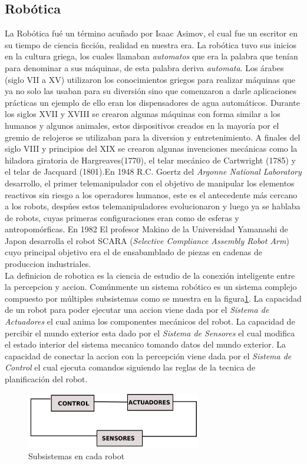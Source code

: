 \documentclass[conference]{IEEEtran}
\begin{document}
\subsection{Rob\'otica}
La Rob\'otica fu\'e un t\'ermino acu\~nado por Isaac Asimov, el cual fue un escritor en su tiempo de ciencia ficci\'on, realidad en nuestra era. La rob\'otica tuvo sus inicios en la cultura griega, los cuales llamaban \emph{automatos} que era la palabra que ten\'ian para denominar a sus m\'aquinas, de esta palabra deriva \emph{automata}. Los \'arabes (siglo VII a XV) utilizaron los conocimientos griegos para realizar m\'aquinas que ya no solo las usaban para su diversi\'on sino que comenzaron a darle aplicaciones pr\'acticas un ejemplo de ello eran los dispensadores de agua autom\'aticos. Durante los siglos XVII y XVIII  se crearon algunas m\'aquinas con forma similar a los humanos y algunos animales, estos dispositivos creados en la mayor\'ia por el gremio de relojeros se utilizaban para la diversion y entretenimiento. A finales del siglo VIII y principios del XIX se crearon algunas invenciones mec\'anicas como la hiladora giratoria de Hargreaves(1770), el telar mec\'anico de Cartwright (1785) y el telar de Jacquard (1801).En 1948 R.C. Goertz del \emph{Argonne National Laboratory} desarrollo, el primer telemanipulador con el objetivo de manipular los elementos reactivos sin riesgo a los operadores humanos, este es el antecedente m\'as cercano a los robots, desp\'ues estos telemanipuladores evolucionaron y luego ya se hablaba de robots, cuyas primeras configuraciones eran como de esferas y antropom\'orficas. En 1982 El profesor Makino de la Universidad Yamanashi de Japon desarrolla el robot SCARA (\emph{Selective Compliance Assembly Robot Arm}) cuyo principal objetivo era el de ensabamblado de piezas en cadenas de produccion industriales. \cite{lib_rob1}\\
La definicion de robotica es la ciencia de estudio de la conexi\'on inteligente entre la percepcion y accion. Com\'unmente un sistema rob\'otico es un sistema complejo compuesto por m\'ultiples subsistemas como se muestra en la figura\ref{fig_rob}. La capacidad de un robot para poder ejecutar una accion viene dada por el \textit{Sistema de Actuadores} el cual anima los componentes mec\'anicos del robot. La capacidad de percibir el mundo exterior esta dado por el \textit{Sistema de Sensores} el cual modifica el estado interior del sistema mecanico tomando datos del mundo exterior. La capacidad de conectar la accion con la percepci\'on viene dada por el \textit{Sistema de Control} el cual ejecuta comandos siguiendo las reglas de la tecnica de planificaci\'on del robot.\cite{lib_rob2}
\begin{figure}
\centering
\includegraphics[width=3.0in]{imagen3.pdf}

\caption{Subsistemas en cada robot}
\label{fig_rob}
\end{figure}
\end{document}
